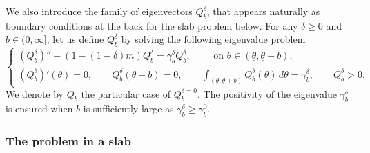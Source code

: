 \documentclass[11pt]{article}    %
\begin{document}
We also introduce the family of eigenvectors $Q_b^\delta$, that appears naturally as boundary conditions at the back for the slab problem below. For any $\delta \geq 0$ and $b\in (0,\infty]$, let us define $Q_b^\delta$ by solving the following eigenvalue problem  
\begin{equation}\label{eq:eigenpb}
\begin{cases} 
	\left( Q_b^\delta \right) '' + \left( 1 - (1-\delta) m \right)Q_b^\delta = \gamma_b^\delta Q_b^\delta, \qquad \text{ on }\theta\in (\underline\theta, \underline\theta + b),\\
	\left( Q_b^\delta \right)' \left( \underline\theta \right) = 0,
	\qquad Q_b^\delta \left(\underline\theta + b \right) = 0,
	\qquad \int_{(\underline\theta, \underline\theta + b)} Q_b^\delta(\theta)\, d\theta = \gamma_b^\delta,
	\qquad Q_b^\delta > 0.	
\end{cases}
\end{equation}
We denote by $Q_b$ the particular case of $Q_b^{\delta = 0}$. The positivity of the eigenvalue $\gamma_b^\delta$ is ensured when $b$ is sufficiently large as $\gamma_b^\delta \geq \gamma_b^0$. %
%



\subsubsection{The problem in a slab}\label{sec:slab}
\end{document}
